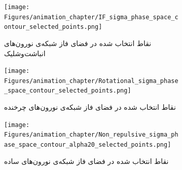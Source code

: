 \begin{figure}[!h]
	\begin{subfigure}{0.5\textwidth}
	\texttt{[image: Figures/animation\_chapter/IF\_sigma\_phase\_space\_contour\_selected\_points.png]}
	\caption{
		نقاط انتخاب شده در فضای فاز شبکه‌ی نورون‌های انباشت‌وشلیک
	}
	\label{fig:IF_abc}
	\end{subfigure}
	\hfill
	\begin{subfigure}{0.5\textwidth}
		\texttt{[image: Figures/animation\_chapter/Rotational\_sigma\_phase\_space\_contour\_selected\_points.png]}
		\caption{
		نقاط انتخاب شده در فضای فاز شبکه‌ی نورون‌های چرخنده
	}
		\label{fig:Rotational_abc}
	\end{subfigure}
	\hfill
	\begin{subfigure}{0.5\textwidth}
		\texttt{[image: Figures/animation\_chapter/Non\_repulsive\_sigma\_phase\_space\_contour\_alpha20\_selected\_points.png]}
		\caption{
		نقاط انتخاب شده در فضای فاز شبکه‌ی نورون‌های ساده
		}
		\label{fig:Non_repulsive_abc}
	\end{subfigure}
	\hfill
	\caption{}
	\label{fig:abc_points_neuron_models}
\end{figure}

